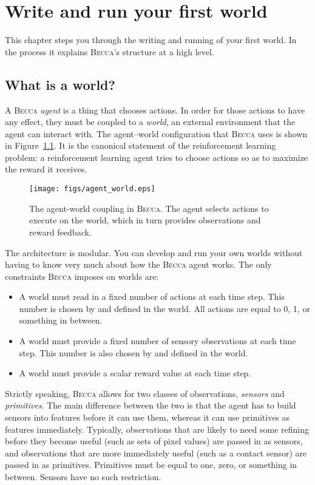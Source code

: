 \chapter{Write and run your first world}

This chapter steps you through the writing and running of your first world. In the process it explains \textsc{Becca}'s structure at a high level.

\section{What is a world?}

A \textsc{Becca} {\em agent} is a thing that chooses actions. In order for those actions to have any effect, they must be coupled to a {\em world}, an external environment that the agent can interact with. The agent--world configuration that \textsc{Becca} uses is shown in Figure~\ref{agent_world}. It is the canonical statement of the reinforcement learning problem: a reinforcement learning agent tries to choose actions so as to maximize the reward it receives.~\cite{sutton98} 

\begin{figure}
\centering
\texttt{[image: figs/agent\_world.eps]}
\caption{The agent-world coupling in \textsc{Becca}. The agent selects actions to execute on the world, which in turn provides observations and reward feedback.}
\label{agent_world}
\end{figure}

The architecture is modular. You can develop and run your own worlds without having to know very much about how the \textsc{Becca} agent works. The only constraints \textsc{Becca} imposes on worlds are:

\begin{itemize}
\item{A world must read in a fixed number of actions at each time step. This number is chosen by and defined in the world. All actions are equal to 0, 1, or something in between.}
\item{A world must provide a fixed number of sensory observations at each time step. This number is also chosen by and defined in the world.}
\item{A world must provide a scalar reward value at each time step.}
\end{itemize}

Strictly speaking, \textsc{Becca} allows for two classes of observations, {\em sensors} and {\em primitives}. The main difference between the two is that the agent has to build sensors into features before it can use them, whereas it can use primitives as features immediately. Typically, observations that are likely to need some refining before they become useful (such as sets of pixel values) are passed in as sensors, and observations that are more immediately useful (such as a contact sensor) are passed in as primitives. Primitives must be equal to one, zero, or something in between. Sensors have no such restriction.

